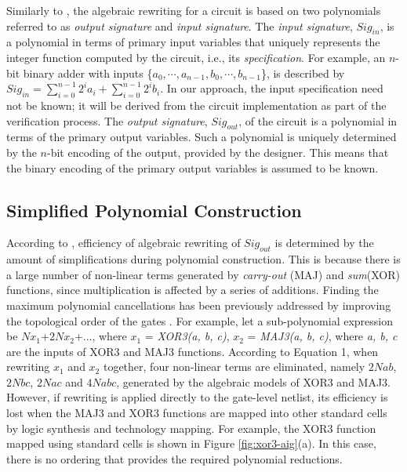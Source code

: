 Similarly to \cite{ciesielski2015verification}, the algebraic rewriting for a circuit is based on two polynomials referred to as {\it output signature} and {\it input signature}.
The \emph{input signature}, $Sig_{in}$, is a polynomial in terms of primary input variables that uniquely represents the integer function computed by the circuit, i.e., its {\it specification}. For example, an $n$-bit binary adder with inputs \{$a_0,\cdots,a_{n-1},b_0,\cdots,b_{n-1}$\}, is described by $Sig_{in} = \sum _{i=0} ^{n-1} 2^i a_i + \sum _{i=0} ^{n-1} 2^i b_i$. 
In our approach, the input specification need not be known; it will be derived from the circuit implementation as part of the verification process. The \emph{output signature}, $Sig_{out}$, of the circuit is a polynomial in terms of the primary output variables. Such a polynomial is uniquely determined by the $n$-bit encoding of the output, provided by the designer. This means that the binary encoding of the primary output variables is assumed to be known. 

\subsection{Simplified Polynomial Construction}

According to \cite{yu:2016-tcad-verification}, efficiency of algebraic rewriting of $Sig_{out}$ is determined by the amount of simplifications during polynomial construction. This is because there is a large number of non-linear terms generated by \textit{carry-out} (MAJ) and \textit{sum}(XOR) functions, since multiplication is affected by a series of additions. Finding the maximum polynomial cancellations has been previously addressed by improving the topological order of the gates \cite{yu:2016-tcad-verification}. For example, let a sub-polynomial expression be $N$$x_1$+$2N$$x_2$+..., where $x_1$ = \textit{XOR3(a, b, c)}, $x_2$ = \textit{MAJ3(a, b, c)}, where \textit{a, b, c} are the inputs of XOR3 and MAJ3 functions. According to Equation 1, when rewriting $x_1$ and $x_2$ together, four non-linear terms are eliminated, namely $2N$$ab$, $2N$$bc$, $2N$$ac$ and $4N$$abc$, generated by the algebraic models of XOR3 and MAJ3. However, if rewriting is applied directly to the gate-level netlist, its efficiency is lost when the MAJ3 and XOR3 functions are mapped into other standard cells by logic synthesis and technology mapping. For example, the XOR3 function mapped using standard cells is shown in Figure \ref{fig:xor3-aig}(a). In this case, there is no ordering that provides the required polynomial reductions. 





